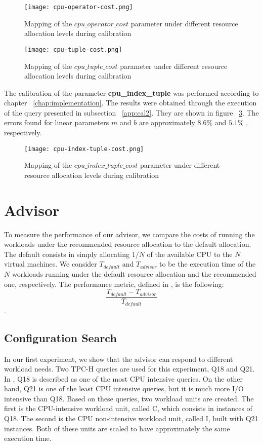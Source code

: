  
 \begin{figure}[ht]
 \centering
 \texttt{[image: cpu-operator-cost.png]}
 \caption{Mapping of the $cpu\_operator\_cost$ parameter under different resource allocation levels during calibration}
 \label{fig:cpuop}
 \end{figure} 
% 
% 
 \begin{figure}[ht]
 \centering
 \texttt{[image: cpu-tuple-cost.png]}
 \caption{Mapping of the $cpu\_tuple\_cost$ parameter under different resource allocation levels during calibration}
 \label{fig:cputp}
 \end{figure} 
 
 The calibration of the parameter \textbf{cpu\_index\_tuple} was performed according to chapter ~\ref{chap:implementation}. The results were obtained through the execution of the query presented in subsection ~\ref{app:cal2}. They are shown in figure ~\ref{fig:cpuip}. The errors found for linear parameters $m$ and $b$ are approximately $8.6\%$ and $5.1\%$ , respectively.

 \begin{figure}[ht]
 \centering
 \texttt{[image: cpu-index-tuple-cost.png]}
 \caption{Mapping of the $cpu\_index\_tuple\_cost$ parameter under different resource allocation levels during calibration}
 \label{fig:cpuip}
 \end{figure} 
 
 \section{Advisor}
 

 
 To measure the performance of our advisor, we compare the costs of running the workloads under the recommended resource allocation to the default allocation. The default consists in simply allocating $1/N$ of the available CPU to the $N$ virtual machines. We consider $T_{default}$ and $T_{advisor}$ to be the execution time of the $N$ workloads running under the default resource allocation and the recommended one, respectively. The performance metric, defined in \cite{Soror:2008:AVM:1376616.1376711}, is the following:
 \[
  \frac{T_{default}-T_{advisor}}{T_{default}}
 \]
.
\subsection{Configuration Search}

In our first experiment, we show that the advisor can respond to different workload needs. Two TPC-H queries are used for this experiment, Q18 and Q21. In \cite{Soror:2008:AVM:1376616.1376711}, Q18 is described as one of the most CPU intensive queries. On the other hand, Q21 is one of the least CPU intensive queries, but it is much more I/O intensive than Q18. Based on these queries, two workload units are created. The first is the CPU-intensive workload unit, called C, which consists in instances of Q18. The second is the CPU non-intensive workload unit, called I, built with Q21 instances. Both of these units are scaled to have approximately the same execution time.

